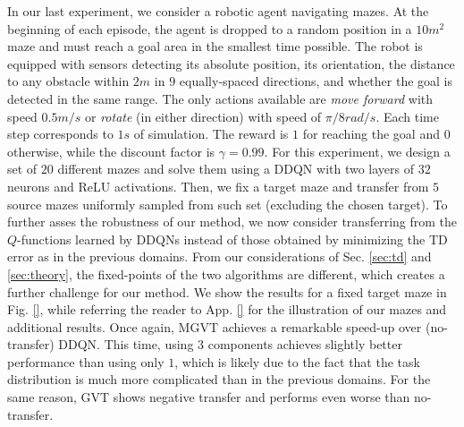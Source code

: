 \documentclass{article}
\begin{document}
In our last experiment, we consider a robotic agent navigating mazes. At the beginning of each episode, the agent is dropped to a random position in a $10m^2$ maze and must reach a goal area in the smallest time possible. The robot is equipped with sensors detecting its absolute position, its orientation, the distance to any obstacle within $2m$ in $9$ equally-spaced directions, and whether the goal is detected in the same range. The only actions available are \textit{move forward} with speed $0.5m/s$ or \textit{rotate} (in either direction) with speed of $\pi/8 rad/s$. Each time step corresponds to $1s$ of simulation. The reward is $1$ for reaching the goal and $0$ otherwise, while the discount factor is $\gamma=0.99$. For this experiment, we design a set of $20$ different mazes and solve them using a DDQN with two layers of $32$ neurons and ReLU activations. Then, we fix a target maze and transfer from $5$ source mazes uniformly sampled from such set (excluding the chosen target). To further asses the robustness of our method, we now consider transferring from the $Q$-functions learned by DDQNs instead of those obtained by minimizing the TD error as in the previous domains. From our considerations of Sec. \ref{sec:td} and \ref{sec:theory}, the fixed-points of the two algorithms are different, which creates a further challenge for our method. We show the results for a fixed target maze in Fig. \ref{}, while referring the reader to App.  \ref{} for the illustration of our mazes and additional results. Once again, MGVT achieves a remarkable speed-up over (no-transfer) DDQN. This time, using $3$ components achieves slightly better performance than using only $1$, which is likely due to the fact that the task distribution is much more complicated than in the previous domains. For the same reason, GVT shows negative transfer and performs even worse than no-transfer.
 
\end{document}
